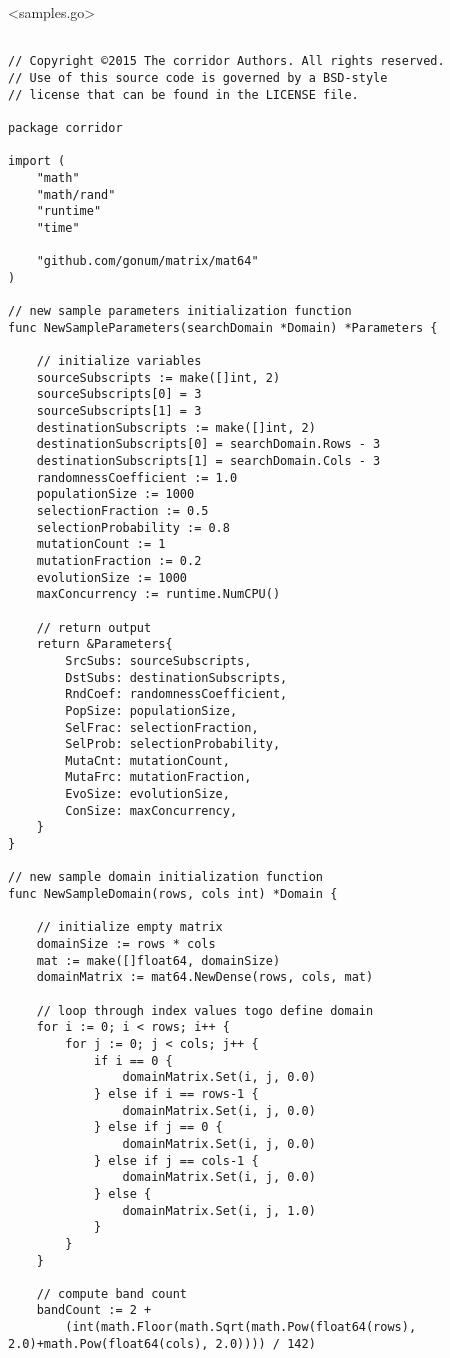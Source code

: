 \newpage

<samples.go>

\begin{lstlisting}[basicstyle=\tiny]

// Copyright ©2015 The corridor Authors. All rights reserved.
// Use of this source code is governed by a BSD-style
// license that can be found in the LICENSE file.

package corridor

import (
	"math"
	"math/rand"
	"runtime"
	"time"

	"github.com/gonum/matrix/mat64"
)

// new sample parameters initialization function
func NewSampleParameters(searchDomain *Domain) *Parameters {

	// initialize variables
	sourceSubscripts := make([]int, 2)
	sourceSubscripts[0] = 3
	sourceSubscripts[1] = 3
	destinationSubscripts := make([]int, 2)
	destinationSubscripts[0] = searchDomain.Rows - 3
	destinationSubscripts[1] = searchDomain.Cols - 3
	randomnessCoefficient := 1.0
	populationSize := 1000
	selectionFraction := 0.5
	selectionProbability := 0.8
	mutationCount := 1
	mutationFraction := 0.2
	evolutionSize := 1000
	maxConcurrency := runtime.NumCPU()

	// return output
	return &Parameters{
		SrcSubs: sourceSubscripts,
		DstSubs: destinationSubscripts,
		RndCoef: randomnessCoefficient,
		PopSize: populationSize,
		SelFrac: selectionFraction,
		SelProb: selectionProbability,
		MutaCnt: mutationCount,
		MutaFrc: mutationFraction,
		EvoSize: evolutionSize,
		ConSize: maxConcurrency,
	}
}

// new sample domain initialization function
func NewSampleDomain(rows, cols int) *Domain {

	// initialize empty matrix
	domainSize := rows * cols
	mat := make([]float64, domainSize)
	domainMatrix := mat64.NewDense(rows, cols, mat)

	// loop through index values togo define domain
	for i := 0; i < rows; i++ {
		for j := 0; j < cols; j++ {
			if i == 0 {
				domainMatrix.Set(i, j, 0.0)
			} else if i == rows-1 {
				domainMatrix.Set(i, j, 0.0)
			} else if j == 0 {
				domainMatrix.Set(i, j, 0.0)
			} else if j == cols-1 {
				domainMatrix.Set(i, j, 0.0)
			} else {
				domainMatrix.Set(i, j, 1.0)
			}
		}
	}

	// compute band count
	bandCount := 2 + 
	    (int(math.Floor(math.Sqrt(math.Pow(float64(rows), 2.0)+math.Pow(float64(cols), 2.0)))) / 142)


\end{lstlisting}

